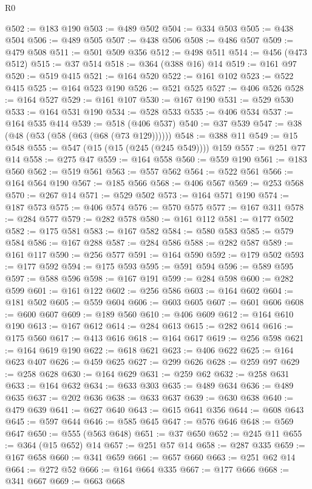 \begin{lexlean}{R0}
\begin{coremodule}
@502 := @183 @190
@503 := @489 @502
@504 := @334 @503
@505 := @438 @504
@506 := @489 @505
@507 := @438 @506
@508 := @486 @507
@509 := @479 @508
@511 := @501 @509 @356
@512 := @498 @511
@514 := @456 (@473 @512)
@515 := @37 @514
@518 := @364 (@388 @16) @14
@519 := @161 @97
@520 := @519 @415
@521 := @164 @520
@522 := @161 @102
@523 := @522 @415
@525 := @164 @523 @190
@526 := @521 @525
@527 := @406 @526
@528 := @164 @527
@529 := @161 @107
@530 := @167 @190
@531 := @529 @530
@533 := @164 @531 @190
@534 := @528 @533
@535 := @406 @534
@537 := @164 @535 @414
@539 := @518 (@406 @537)
@540 := @37 @539
@547 := @38 (@48 (@53 (@58 (@63 (@68 (@73 @129))))))
@548 := @388 @11
@549 := @15 @548
@555 := @547 (@15 (@15 (@245 (@245 @549)))) @159
@557 := @251 @77 @14
@558 := @275 @47
@559 := @164 @558
@560 := @559 @190
@561 := @183 @560
@562 := @519 @561
@563 := @557 @562
@564 := @522 @561
@566 := @164 @564 @190
@567 := @185 @566
@568 := @406 @567
@569 := @253 @568
@570 := @267 @14
@571 := @529 @502
@573 := @164 @571 @190
@574 := @187 @573
@575 := @406 @574
@576 := @570 @575
@577 := @167 @311
@578 := @284 @577
@579 := @282 @578
@580 := @161 @112
@581 := @177 @502
@582 := @175 @581
@583 := @167 @582
@584 := @580 @583
@585 := @579 @584
@586 := @167 @288
@587 := @284 @586
@588 := @282 @587
@589 := @161 @117
@590 := @256 @577
@591 := @164 @590
@592 := @179 @502
@593 := @177 @592
@594 := @175 @593
@595 := @591 @594
@596 := @589 @595
@597 := @588 @596
@598 := @167 @191
@599 := @284 @598
@600 := @282 @599
@601 := @161 @122
@602 := @256 @586
@603 := @164 @602
@604 := @181 @502
@605 := @559 @604
@606 := @603 @605
@607 := @601 @606
@608 := @600 @607
@609 := @189 @560
@610 := @406 @609
@612 := @164 @610 @190
@613 := @167 @612
@614 := @284 @613
@615 := @282 @614
@616 := @175 @560
@617 := @413 @616
@618 := @164 @617
@619 := @256 @598
@621 := @164 @619 @190
@622 := @618 @621
@623 := @406 @622
@625 := @164 @623 @407
@626 := @459 @625
@627 := @299 @626
@628 := @259 @97
@629 := @258 @628
@630 := @164 @629
@631 := @259 @62
@632 := @258 @631
@633 := @164 @632
@634 := @633 @303
@635 := @489 @634
@636 := @489 @635
@637 := @202 @636
@638 := @633 @637
@639 := @630 @638
@640 := @479 @639
@641 := @627 @640
@643 := @615 @641 @356
@644 := @608 @643
@645 := @597 @644
@646 := @585 @645
@647 := @576 @646
@648 := @569 @647
@650 := @555 (@563 @648)
@651 := @37 @650
@652 := @245 @11
@655 := @364 (@15 @652) @14
@657 := @251 @57 @14
@658 := @287 @335
@659 := @167 @658
@660 := @341 @659
@661 := @657 @660
@663 := @251 @62 @14
@664 := @272 @52
@666 := @164 @664 @335
@667 := @177 @666
@668 := @341 @667
@669 := @663 @668

\end{coremodule}
\end{lexlean}
